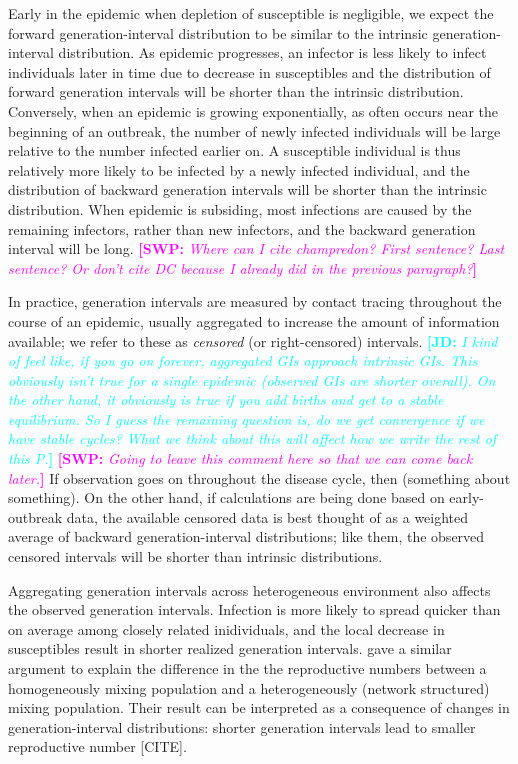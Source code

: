 \documentclass{article}
\newcommand{\comment}[3]{\textcolor{#1}{\textbf{[#2: }\textsl{#3}\textbf{]}}}
\newcommand{\jd}[1]{\comment{cyan}{JD}{#1}}
\newcommand{\swp}[1]{\comment{magenta}{SWP}{#1}}
\begin{document}
Early in the epidemic when depletion of susceptible is negligible, we expect the forward generation-interval distribution to be similar to the intrinsic generation-interval distribution.
As epidemic progresses, an infector is less likely to infect individuals later in time due to decrease in susceptibles and the distribution of forward generation intervals will be shorter than the intrinsic distribution.
Conversely, when an epidemic is growing exponentially, as often occurs near the beginning of an outbreak, the number of newly infected individuals will be large relative to the number infected earlier on. 
A susceptible individual is thus relatively more likely to be infected by a newly infected individual, and the distribution of backward generation intervals will be shorter than the intrinsic distribution.
When epidemic is subsiding, most infections are caused by the remaining infectors, rather than new infectors, and the backward generation interval will be long.
\swp{Where can I cite champredon? First sentence? Last sentence? Or don't cite DC because I already did in the previous paragraph?}

In practice, generation intervals are measured by contact tracing throughout the course of an epidemic, usually aggregated to increase the amount of information available; we refer to these as \emph{censored} (or right-censored) intervals.
\jd{I kind of feel like, if you go on forever, aggregated GIs approach intrinsic GIs. This obviously isn't true for a single epidemic (observed GIs are shorter overall). On the other hand, it obviously \emph{is} true if you add births and get to a stable equilibrium. So I guess the remaining question is, do we get convergence if we have stable cycles? What we think about this will affect how we write the rest of this P.} \swp{Going to leave this comment here so that we can come back later.}
If observation goes on throughout the disease cycle, then (something about something).
On the other hand, if calculations are being done based on early-outbreak data, the available censored data is best thought of as a weighted average of backward generation-interval distributions; like them, the observed censored intervals will be shorter than intrinsic distributions.

Aggregating generation intervals across heterogeneous environment also affects the observed generation intervals.
Infection is more likely to spread quicker than on average among closely related inidividuals, and the local decrease in susceptibles result in shorter realized generation intervals.
\cite{trapman2016inferring} gave a similar argument to explain the difference in the the reproductive numbers between a homogeneously mixing population and a heterogeneously (network structured) mixing population.
Their result can be interpreted as a consequence of changes in generation-interval distributions: shorter generation intervals lead to smaller reproductive number [CITE]. 
\end{document}
